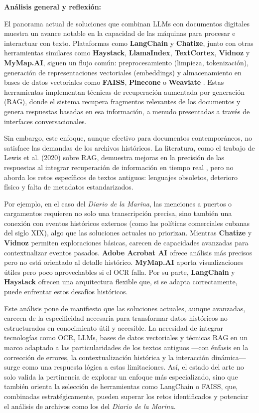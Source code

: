 \textbf{Análisis general y reflexión:}

El panorama actual de soluciones que combinan LLMs con documentos digitales muestra un avance notable en la capacidad de las máquinas para procesar e interactuar con texto. Plataformas como \textbf{LangChain} y \textbf{Chatize}, junto con otras herramientas similares como \textbf{Haystack}, \textbf{LlamaIndex}, \textbf{TextCortex}, \textbf{Vidnoz} y \textbf{MyMap.AI}, siguen un flujo común: preprocesamiento (limpieza, tokenización), generación de representaciones vectoriales (embeddings) y almacenamiento en bases de datos vectoriales como \textbf{FAISS}, \textbf{Pinecone} o \textbf{Weaviate} \cite{lewis2020retrieval, mikolov2013efficient, chatize2023web, haystack2023docs, llamaindex2023web}. Estas herramientas implementan técnicas de recuperación aumentada por generación (RAG), donde el sistema recupera fragmentos relevantes de los documentos y genera respuestas basadas en esa información, a menudo presentadas a través de interfaces conversacionales.

Sin embargo, este enfoque, aunque efectivo para documentos contemporáneos, no satisface las demandas de los archivos históricos. La literatura, como el trabajo de Lewis et al. (2020) sobre RAG, demuestra mejoras en la precisión de las respuestas al integrar recuperación de información en tiempo real \cite{lewis2020retrieval}, pero no aborda los retos específicos de textos antiguos: lenguajes obsoletos, deterioro físico y falta de metadatos estandarizados.

Por ejemplo, en el caso del \textit{Diario de la Marina}, las menciones a puertos o cargamentos requieren no solo una transcripción precisa, sino también una conexión con eventos históricos externos (como las políticas comerciales cubanas del siglo XIX), algo que las soluciones actuales no priorizan. Mientras \textbf{Chatize} y \textbf{Vidnoz} permiten exploraciones básicas, carecen de capacidades avanzadas para contextualizar eventos pasados. \textbf{Adobe Acrobat AI} ofrece análisis más precisos pero no está orientado al detalle histórico. \textbf{MyMap.AI} aporta visualizaciones útiles pero poco aprovechables si el OCR falla. Por su parte, \textbf{LangChain} y \textbf{Haystack} ofrecen una arquitectura flexible que, si se adapta correctamente, puede enfrentar estos desafíos históricos.

Este análisis pone de manifiesto que las soluciones actuales, aunque avanzadas, carecen de la especificidad necesaria para transformar datos históricos no estructurados en conocimiento útil y accesible. La necesidad de integrar tecnologías como OCR, LLMs, bases de datos vectoriales y técnicas RAG en un marco adaptado a las particularidades de los textos antiguos —con énfasis en la corrección de errores, la contextualización histórica y la interacción dinámica— surge como una respuesta lógica a estas limitaciones. Así, el estado del arte no solo valida la pertinencia de explorar un enfoque más especializado, sino que también orienta la selección de herramientas como LangChain o FAISS, que, combinadas estratégicamente, pueden superar los retos identificados y potenciar el análisis de archivos como los del \textit{Diario de la Marina}.

